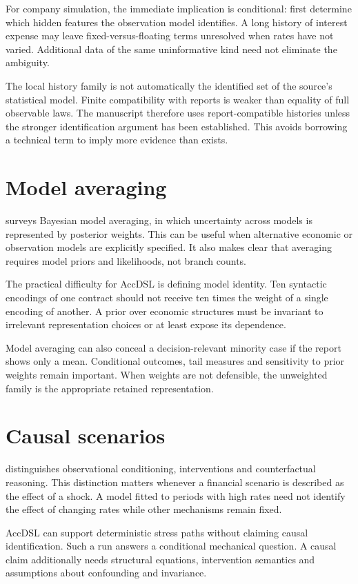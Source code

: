 For company simulation, the immediate implication is conditional: first determine which hidden features the observation model identifies. A long history of interest expense may leave fixed-versus-floating terms unresolved when rates have not varied. Additional data of the same uninformative kind need not eliminate the ambiguity.

The local history family is not automatically the identified set of the source's statistical model. Finite compatibility with reports is weaker than equality of full observable laws. The manuscript therefore uses report-compatible histories unless the stronger identification argument has been established. This avoids borrowing a technical term to imply more evidence than exists.

\section{Model averaging}
\citet{hoeting1999} surveys Bayesian model averaging, in which uncertainty across models is represented by posterior weights. This can be useful when alternative economic or observation models are explicitly specified. It also makes clear that averaging requires model priors and likelihoods, not branch counts.

The practical difficulty for AccDSL is defining model identity. Ten syntactic encodings of one contract should not receive ten times the weight of a single encoding of another. A prior over economic structures must be invariant to irrelevant representation choices or at least expose its dependence.

Model averaging can also conceal a decision-relevant minority case if the report shows only a mean. Conditional outcomes, tail measures and sensitivity to prior weights remain important. When weights are not defensible, the unweighted family is the appropriate retained representation.

\section{Causal scenarios}
\citet[Sections 3.2--3.4]{pearl2009} distinguishes observational conditioning, interventions and counterfactual reasoning. This distinction matters whenever a financial scenario is described as the effect of a shock. A model fitted to periods with high rates need not identify the effect of changing rates while other mechanisms remain fixed.

AccDSL can support deterministic stress paths without claiming causal identification. Such a run answers a conditional mechanical question. A causal claim additionally needs structural equations, intervention semantics and assumptions about confounding and invariance.

